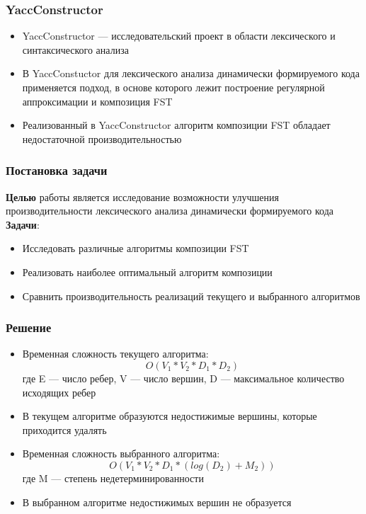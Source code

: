 \documentclass{beamer}
\begin{document}
\begin{frame}
  \transwipe[direction=90]
  \frametitle{YaccConstructor}
  \begin{itemize}
    \item YaccConstructor — исследовательский проект в области 
    лексического и синтаксического анализа
    \item В YaccConstuctor для лексического анализа динамически формируемого кода
    применяется подход, в основе которого лежит построение  регулярной аппроксимации и 
    композиция FST
    \item Реализованный в YaccConstructor алгоритм композиции FST обладает недостаточной
    производительностью
  \end{itemize}
\end{frame}

\begin{frame}
  \transwipe[direction=90]
  \frametitle{Постановка задачи}
  \textbf{Целью} работы является исследование возможности улучшения
  производительности лексического анализа динамически 
  формируемого кода\\[2\baselineskip]

  \textbf{Задачи}:
  \begin{itemize}
    \item Исследовать различные алгоритмы композиции FST
    \item Реализовать наиболее оптимальный алгоритм композиции
    \item Сравнить производительность реализаций текущего и выбранного алгоритмов
  \end{itemize}
\end{frame}

\begin{frame}
  \transwipe[direction=90]
  \frametitle{Решение}
  \begin{itemize}
    \item Временная сложность текущего алгоритма: \\
    \[O(V_1 * V_2 * D_1 * D_2)\]
    где E — число ребер, V — число вершин, D — максимальное количество исходящих ребер
    \item В текущем алгоритме образуются недостижимые вершины, которые приходится удалять
    \item Временная сложность выбранного алгоритма: \\
    \[O(V_1 * V_2 * D_1 * (log(D_2) + M_2))\]
    где M — степень недетерминированности
    \item В выбранном алгоритме недостижимых вершин не образуется
  \end{itemize}
\end{frame}
\end{document}
